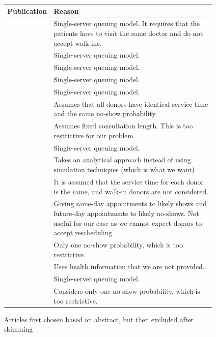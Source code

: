 \documentclass[a4paper,12pt]{article}
\begin{document}
\begin{figure}[H]
    \begin{table}[H]
    \begin{tabularx}{\textwidth}{@{} c Y @{}}
    \toprule
    Publication & Reason \\ \midrule
    \cite{BD38}        &    Single-server queuing model. It requires that the patients have to visit the same doctor and do not accept walk-ins. \\
    \cite{BD06}        &    Single-server queuing model. \\
    \cite{BD40}        &    Single-server queuing model. \\
    \cite{BD15}        &    Single-server queuing model. \\
    \cite{BD31}        &    Single-server queuing model. \\
    \cite{BD14}        &    Assumes that all donors have identical service time and the same no-show probability. \\
    \cite{BD41}        &    Assumes fixed consultation length. This is too restrictive for our problem. \\
    \cite{BD09}        &    Single-server queuing model. \\
    \cite{BD18}        &    Takes an analytical approach instead of using simulation techniques (which is what we want) \\
    \cite{BD42}        &    It is assumed that the service time for each donor is the same, and walk-in donors are not considered. \\
    \cite{BD19}        &    Giving same-day appointments to likely shows and future-day appointments to likely no-shows. Not useful for our case as we cannot expect donors to accept rescheduling. \\
    \cite{BD48}        &    Only one no-show probability, which is too restrictive. \\
    \cite{BD44}        &    Uses health information that we are not provided. \\
    \cite{BD05}        &    Single-server queuing model. \\
    \cite{BD47}        &    Considers only one no-show probability, which is too restrictive. \\
    \bottomrule
    \end{tabularx}
    \end{table}
    \caption{Articles first chosen based on abstract, but then excluded after skimming}
    \label{semi-good}
\end{figure}
\end{document}
